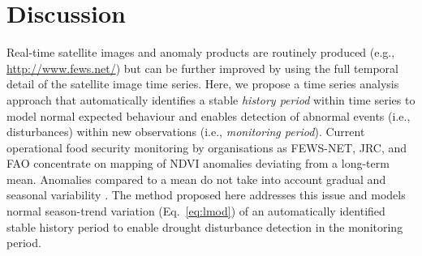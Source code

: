 \documentclass[authoryear,preprint,review,10pt]{elsarticle}
\begin{document}
\section{Discussion} \label{sec:Disc}

Real-time satellite images and anomaly products are routinely produced (e.g., \url{http://www.fews.net/}) but can be further improved by using the full temporal detail of the satellite image time series. Here, we propose a time series analysis approach that automatically identifies a stable \emph{history period} within time series to model normal expected behaviour and enables detection of abnormal events (i.e., disturbances) within new observations (i.e., \emph{monitoring period}). Current operational food security monitoring by organisations as FEWS-NET, JRC, and FAO concentrate on mapping of NDVI anomalies deviating from a long-term mean. Anomalies compared to a mean do not take into account gradual and seasonal variability \citep{Vrieling:2011da}. The method proposed here addresses this issue and models normal season-trend variation (Eq.~\ref{eq:lmod}) of an automatically identified stable history period to enable drought disturbance detection in the monitoring period.
\end{document}
